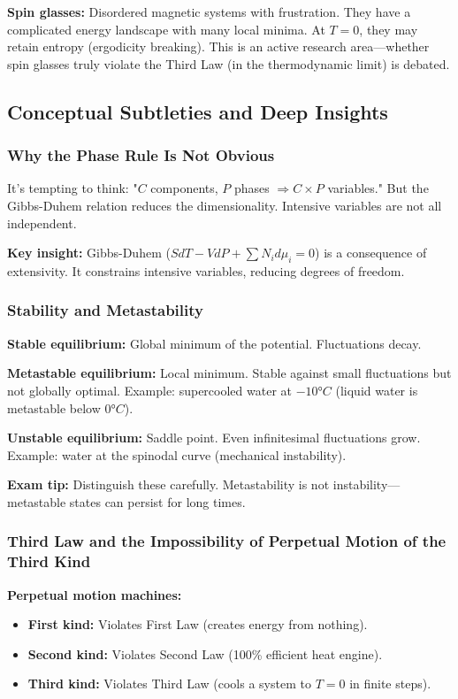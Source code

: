 \documentclass[9pt,twocoloumn]{article}
\begin{document}
\textbf{Spin glasses:} Disordered magnetic systems with frustration. They have a complicated energy landscape with many local minima. At $T = 0$, they may retain entropy (ergodicity breaking). This is an active research area—whether spin glasses truly violate the Third Law (in the thermodynamic limit) is debated.

\subsection{Conceptual Subtleties and Deep Insights}

\subsubsection{Why the Phase Rule Is Not Obvious}

It's tempting to think: "$C$ components, $P$ phases $\Rightarrow C \times P$ variables." But the Gibbs-Duhem relation reduces the dimensionality. Intensive variables are not all independent.

\textbf{Key insight:} Gibbs-Duhem ($S dT - V dP + \sum N_i d\mu_i = 0$) is a consequence of extensivity. It constrains intensive variables, reducing degrees of freedom.

\subsubsection{Stability and Metastability}

\textbf{Stable equilibrium:} Global minimum of the potential. Fluctuations decay.

\textbf{Metastable equilibrium:} Local minimum. Stable against small fluctuations but not globally optimal. Example: supercooled water at $-10°C$ (liquid water is metastable below $0°C$).

\textbf{Unstable equilibrium:} Saddle point. Even infinitesimal fluctuations grow. Example: water at the spinodal curve (mechanical instability).

\textbf{Exam tip:} Distinguish these carefully. Metastability is not instability—metastable states can persist for long times.

\subsubsection{Third Law and the Impossibility of Perpetual Motion of the Third Kind}

\textbf{Perpetual motion machines:}
\begin{itemize}
    \item \textbf{First kind:} Violates First Law (creates energy from nothing).
    \item \textbf{Second kind:} Violates Second Law (100\% efficient heat engine).
    \item \textbf{Third kind:} Violates Third Law (cools a system to $T = 0$ in finite steps).
\end{itemize}
\end{document}
